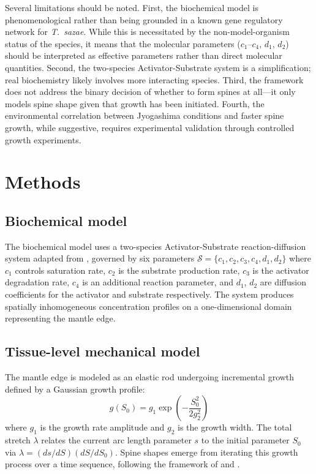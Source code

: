 \documentclass[11pt]{article}
\begin{document}
Several limitations should be noted. First, the biochemical model is phenomenological rather than being grounded in a known gene regulatory network for \textit{T.\ sazae}. While this is necessitated by the non-model-organism status of the species, it means that the molecular parameters ($c_1$--$c_4$, $d_1$, $d_2$) should be interpreted as effective parameters rather than direct molecular quantities. Second, the two-species Activator-Substrate system is a simplification; real biochemistry likely involves more interacting species. Third, the framework does not address the binary decision of whether to form spines at all---it only models spine shape given that growth has been initiated. Fourth, the environmental correlation between Jyogashima conditions and faster spine growth, while suggestive, requires experimental validation through controlled growth experiments.

\section{Methods}

\subsection{Biochemical model}

The biochemical model uses a two-species Activator-Substrate reaction-diffusion system adapted from \citet{fowler2011}, governed by six parameters $\mathcal{S} = \{c_1, c_2, c_3, c_4, d_1, d_2\}$ where $c_1$ controls saturation rate, $c_2$ is the substrate production rate, $c_3$ is the activator degradation rate, $c_4$ is an additional reaction parameter, and $d_1$, $d_2$ are diffusion coefficients for the activator and substrate respectively. The system produces spatially inhomogeneous concentration profiles on a one-dimensional domain representing the mantle edge.

\subsection{Tissue-level mechanical model}

The mantle edge is modeled as an elastic rod undergoing incremental growth defined by a Gaussian growth profile:
\begin{equation}
g(S_0) = g_1 \exp\left(-\frac{S_0^2}{2g_2^2}\right)
\end{equation}
where $g_1$ is the growth rate amplitude and $g_2$ is the growth width. The total stretch $\lambda$ relates the current arc length parameter $s$ to the initial parameter $S_0$ via $\lambda = (ds/dS)(dS/dS_0)$. Spine shapes emerge from iterating this growth process over a time sequence, following the framework of \citet{chirat2013} and \citet{moulton2012}.
\end{document}
